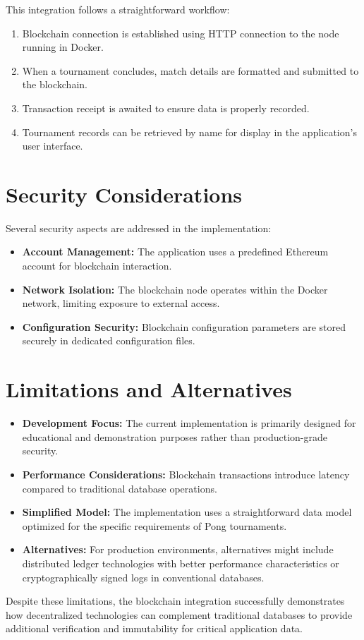 This integration follows a straightforward workflow:
\begin{enumerate}
    \item Blockchain connection is established using HTTP connection to the node running in Docker.
    \item When a tournament concludes, match details are formatted and submitted to the blockchain.
    \item Transaction receipt is awaited to ensure data is properly recorded.
    \item Tournament records can be retrieved by name for display in the application's user interface.
\end{enumerate}

\section{Security Considerations}
\label{sec:blockchain_security}
Several security aspects are addressed in the implementation:
\begin{itemize}
    \item \textbf{Account Management:} The application uses a predefined Ethereum account for blockchain interaction.
    \item \textbf{Network Isolation:} The blockchain node operates within the Docker network, limiting exposure to external access.
    \item \textbf{Configuration Security:} Blockchain configuration parameters are stored securely in dedicated configuration files.
\end{itemize}

\section{Limitations and Alternatives}
\label{sec:blockchain_limits}
\begin{itemize}
    \item \textbf{Development Focus:} The current implementation is primarily designed for educational and demonstration purposes rather than production-grade security.
    \item \textbf{Performance Considerations:} Blockchain transactions introduce latency compared to traditional database operations.
    \item \textbf{Simplified Model:} The implementation uses a straightforward data model optimized for the specific requirements of Pong tournaments.
    \item \textbf{Alternatives:} For production environments, alternatives might include distributed ledger technologies with better performance characteristics or cryptographically signed logs in conventional databases.
\end{itemize}

Despite these limitations, the blockchain integration successfully demonstrates how decentralized technologies can complement traditional databases to provide additional verification and immutability for critical application data.